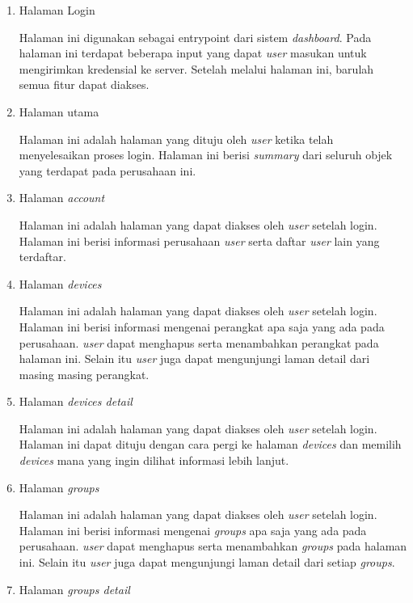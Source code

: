 \begin{enumerate}
  \item Halaman Login

        Halaman ini digunakan sebagai entrypoint dari sistem \textit{dashboard}. Pada halaman ini terdapat beberapa input yang dapat \textit{user} masukan untuk mengirimkan kredensial ke server. Setelah melalui halaman ini, barulah semua fitur dapat diakses.

  \item Halaman utama

        Halaman ini adalah halaman yang dituju oleh \textit{user} ketika telah menyelesaikan proses login. Halaman ini berisi \textit{summary} dari seluruh objek yang terdapat pada perusahaan ini.

  \item Halaman \textit{account}

        Halaman ini adalah halaman yang dapat diakses oleh \textit{user} setelah login. Halaman ini berisi informasi perusahaan \textit{user} serta daftar \textit{user} lain yang terdaftar.

  \item Halaman \textit{devices}

        Halaman ini adalah halaman yang dapat diakses oleh \textit{user} setelah login. Halaman ini berisi informasi mengenai perangkat apa saja yang ada pada perusahaan. \textit{user} dapat menghapus serta menambahkan perangkat pada halaman ini. Selain itu \textit{user} juga dapat mengunjungi laman detail dari masing masing perangkat.

  \item Halaman \textit{devices detail}

        Halaman ini adalah halaman yang dapat diakses oleh \textit{user} setelah login. Halaman ini dapat dituju dengan cara pergi ke halaman \textit{devices} dan memilih \textit{devices} mana yang ingin dilihat informasi lebih lanjut.


  \item Halaman \textit{groups}

        Halaman ini adalah halaman yang dapat diakses oleh \textit{user} setelah login. Halaman ini berisi informasi mengenai \textit{groups} apa saja yang ada pada perusahaan. \textit{user} dapat menghapus serta menambahkan \textit{groups} pada halaman ini. Selain itu \textit{user} juga dapat mengunjungi laman detail dari setiap \textit{groups}.

  \item Halaman \textit{groups detail}


\end{enumerate}
